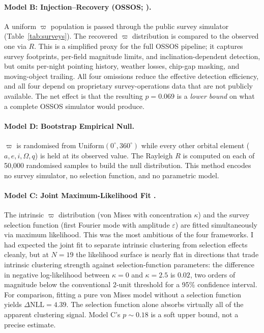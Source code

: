 \documentclass[usenatbib]{mnras}
\begin{document}
\paragraph{Model B: Injection--Recovery (OSSOS; \protect\citealt{shankman2017}).}
A uniform $\varpi$ population is passed through the public survey simulator (Table~\ref{tab:surveys}). The recovered $\varpi$ distribution is compared to the observed one via $R$. This is a simplified proxy for the full OSSOS pipeline; it captures survey footprints, per-field magnitude limits, and inclination-dependent detection, but omits per-night pointing history, weather losses, chip-gap masking, and moving-object trailing. All four omissions reduce the effective detection efficiency, and all four depend on proprietary survey-operations data that are not publicly available. The net effect is that the resulting $p=0.069$ is a \textit{lower bound} on what a complete OSSOS simulator would produce.

\paragraph{Model D: Bootstrap Empirical Null.}
$\varpi$ is randomised from $\mathrm{Uniform}(0^\circ, 360^\circ)$ while every other orbital element ($a, e, i, \Omega, q$) is held at its observed value. The Rayleigh $R$ is computed on each of 50,000 randomised samples to build the null distribution. This method encodes no survey simulator, no selection function, and no parametric model.

\paragraph{Model C: Joint Maximum-Likelihood Fit \protect\citep{napier2021}.}
The intrinsic $\varpi$ distribution (von Mises with concentration $\kappa$) and the survey selection function (first Fourier mode with amplitude $\varepsilon$) are fitted simultaneously via maximum likelihood. This was the most ambitious of the four frameworks. I had expected the joint fit to separate intrinsic clustering from selection effects cleanly, but at $N=19$ the likelihood surface is nearly flat in directions that trade intrinsic clustering strength against selection-function parameters: the difference in negative log-likelihood between $\kappa=0$ and $\kappa=2.5$ is $0.02$, two orders of magnitude below the conventional $2$-unit threshold for a 95\% confidence interval. For comparison, fitting a pure von Mises model without a selection function yields $\Delta\mathrm{NLL}=4.39$. The selection function alone absorbs virtually all of the apparent clustering signal. Model C's $p\sim0.18$ is a soft upper bound, not a precise estimate.
\end{document}
